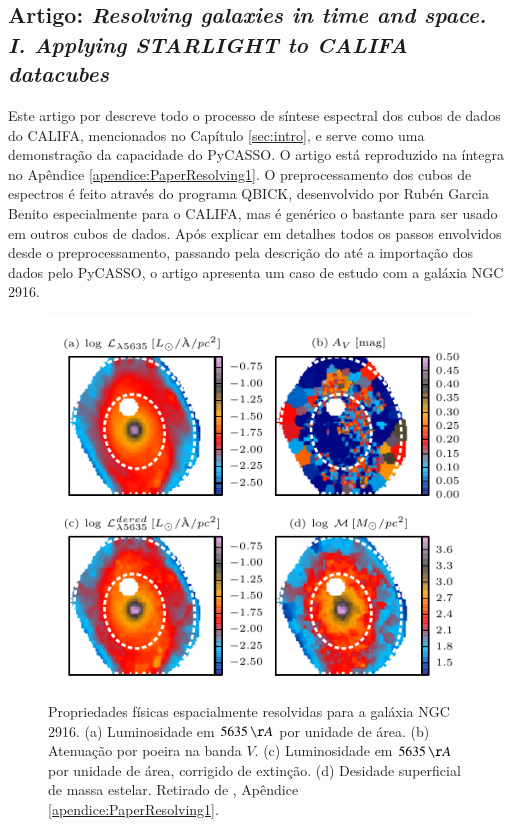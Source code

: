 
\subsection{Artigo: {\em Resolving galaxies in time and space. I. Applying
STARLIGHT to CALIFA datacubes}}
\label{sec:pycasso:art:Resolving1}

Este artigo por \citet{CidFernandes2013a} descreve todo o processo de síntese
espectral dos cubos de dados do CALIFA, mencionados no Capítulo \ref{sec:intro},
e serve como uma demonstração da capacidade do PyCASSO. O artigo está
reproduzido na íntegra no Apêndice \ref{apendice:PaperResolving1}. O
preprocessamento dos cubos de espectros é feito através do programa QBICK,
desenvolvido por Rubén Garcia Benito especialmente para o CALIFA, mas é
genérico o bastante para ser usado em outros cubos de dados. Após explicar em
detalhes todos os passos envolvidos desde o preprocessamento, passando pela
descrição do \starlight até a importação dos dados pelo PyCASSO, o artigo
apresenta um caso de estudo com a galáxia NGC 2916.

\begin{figure}
	\includegraphics{figuras/L-M-AV-K0277}
	\caption[Propriedades físicas espacialmente resolvidas para a galáxia NGC
	2916] {Propriedades físicas espacialmente resolvidas para a galáxia NGC 2916. (a)
	Luminosidade em $5635\,\AA$ por unidade de área. (b) Atenuação por poeira na
	banda $V$. (c) Luminosidade em $5635\,\AA$ por unidade de área, corrigido de
	extinção. (d) Desidade superficial de massa estelar. Retirado de
	\cite[figura 4]{CidFernandes2013a}, Apêndice \ref{apendice:PaperResolving1}.}
	\label{fig:LMAVMap}
\end{figure}


